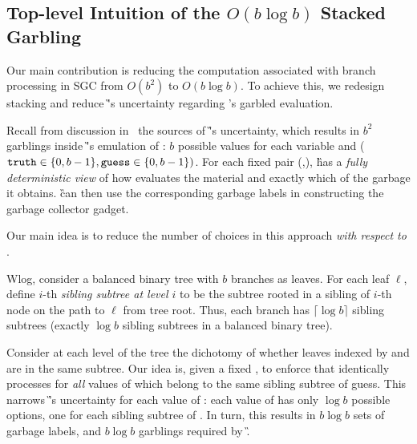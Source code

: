 
\subsection{Top-level Intuition of the $O(b \log b)$ Stacked Garbling}

Our main contribution is reducing the computation associated with branch processing in SGC from $O(b^2)$ to $O(b \log b)$.
To achieve this, we redesign stacking and reduce \G's uncertainty regarding \E's garbled evaluation.  

 
   Recall from discussion in~ the  sources of \G's uncertainty, which results in $b^2$ garblings inside \G's emulation of \E: $b$ possible values for each variable \truth and \guess ($\mathtt{truth} \in\{0,b-1\}, \mathtt{guess}\in\{0,b-1\})$.
   For each fixed pair  (\truth,\guess), \G has a {\em fully deterministic view} of how \E evaluates the material and exactly which of the garbage it obtains.  \G can then use the corresponding garbage labels in constructing the garbage collector gadget.
   
   Our main idea  is to reduce the number of \truth choices in this approach {\em with respect to  \guess}. 
  
  Wlog, consider a balanced binary tree with $b$ branches as leaves. 
  For each leaf $\ell$, define $i$-th {\em sibling subtree at level $i$} to be the subtree rooted in a sibling of $i$-th node on the path to $\ell$ from tree root.  Thus, each branch has $\lceil \log b \rceil$ sibling subtrees (exactly $\log b$ sibling subtrees in a balanced binary tree).
  
  Consider at each level of the tree the dichotomy of whether leaves indexed by \guess and \truth are in the same subtree. Our idea is, given a fixed \guess, to  enforce that \E identically processes \guess for {\em all} values of \truth which belong to the same sibling subtree of guess. This narrows \G’s uncertainty for each value of \guess: each value of \guess has only $\log b$ possible \truth options, one for each sibling subtree of \guess.  In turn, this results in $b\log b$  sets of garbage labels, and $b\log b$ garblings required by \G. 
  
    
\medskip


